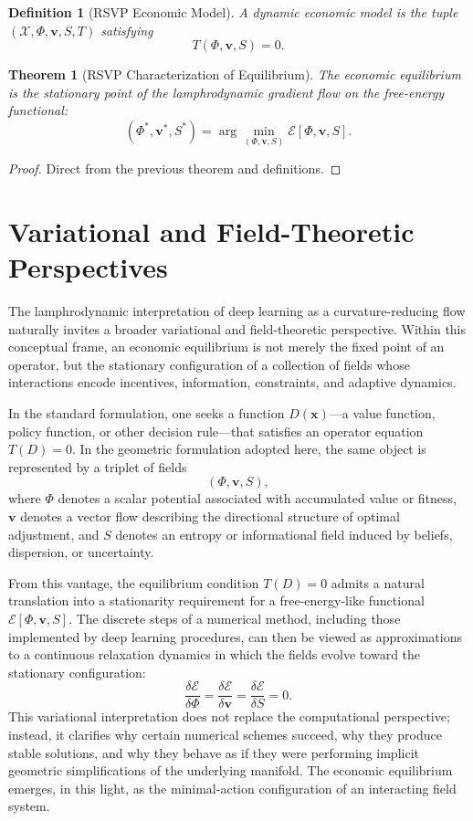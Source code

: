\documentclass[12pt]{article}
\newtheorem{theorem}{Theorem}
\newtheorem{definition}{Definition}
\begin{document}
\begin{definition}[RSVP Economic Model]
A dynamic economic model is the tuple 
$(\mathcal{X},\Phi,\mathbf{v},S,T)$
satisfying
\[
T(\Phi,\mathbf{v},S)=0.
\]
\end{definition}

\begin{theorem}[RSVP Characterization of Equilibrium]
The economic equilibrium is the stationary point of the lamphrodynamic 
gradient flow on the free-energy functional:
\[
(\Phi^\ast,\mathbf{v}^\ast,S^\ast)
=
\arg\min_{(\Phi,\mathbf{v},S)}
    \mathcal{E}[\Phi,\mathbf{v},S].
\]
\end{theorem}

\begin{proof}
Direct from the previous theorem and definitions.
\end{proof}

\section{Variational and Field-Theoretic Perspectives}

The lamphrodynamic interpretation of deep learning as a curvature-reducing flow
naturally invites a broader variational and field-theoretic perspective.
Within this conceptual frame, an economic equilibrium is not merely the fixed
point of an operator, but the stationary configuration of a collection of fields
whose interactions encode incentives, information, constraints, and adaptive
dynamics.

In the standard formulation, one seeks a function \(D(\mathbf{x})\)---a value
function, policy function, or other decision rule---that satisfies an operator
equation \(T(D)=0\).  In the geometric formulation adopted here, the same
object is represented by a triplet of fields
\[
(\Phi, \mathbf{v}, S),
\]
where \(\Phi\) denotes a scalar potential associated with accumulated value or
fitness, \(\mathbf{v}\) denotes a vector flow describing the directional
structure of optimal adjustment, and \(S\) denotes an entropy or informational
field induced by beliefs, dispersion, or uncertainty.

From this vantage, the equilibrium condition \(T(D)=0\) admits a natural
translation into a stationarity requirement for a free-energy-like functional
\(\mathcal{E}[\Phi,\mathbf{v},S]\).  The discrete steps of a numerical method,
including those implemented by deep learning procedures, can then be viewed as
approximations to a continuous relaxation dynamics in which the fields evolve
toward the stationary configuration:
\[
\frac{\delta \mathcal{E}}{\delta \Phi}
= \frac{\delta \mathcal{E}}{\delta \mathbf{v}}
= \frac{\delta \mathcal{E}}{\delta S}
= 0.
\]
This variational interpretation does not replace the computational perspective;
instead, it clarifies why certain numerical schemes succeed, why they produce
stable solutions, and why they behave as if they were performing implicit
geometric simplifications of the underlying manifold.  The economic equilibrium
emerges, in this light, as the minimal-action configuration of an interacting
field system.
\end{document}
